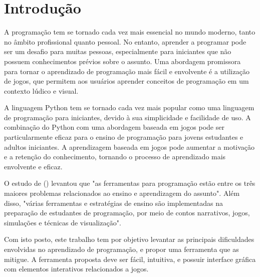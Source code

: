 \chapter[Introdução]{Introdução}

A programação tem se tornado cada vez mais essencial no mundo moderno, tanto no âmbito profissional quanto pessoal. No entanto, aprender a programar pode ser um desafio para muitas pessoas, especialmente para iniciantes que não possuem conhecimentos prévios sobre o assunto. Uma abordagem promissora para tornar o aprendizado de programação mais fácil e envolvente é a utilização de jogos, que permitem aos usuários aprender conceitos de programação em um contexto lúdico e visual.

A linguagem Python tem se tornado cada vez mais popular como uma linguagem de programação para iniciantes, devido à sua simplicidade e facilidade de uso. A combinação do Python com uma abordagem baseada em jogos pode ser particularmente eficaz para o ensino de programação para jovens estudantes e adultos iniciantes. A aprendizagem baseada em jogos pode aumentar a motivação e a retenção do conhecimento, tornando o processo de aprendizado mais envolvente e eficaz.

O estudo de \citeauthor{PereiraEtAll} (\citeyear{PereiraEtAll}) levantou que "as ferramentas para programação estão entre os três maiores problemas relacionados ao ensino e aprendizagem do assunto". Além disso, "várias ferramentas e estratégias de ensino são implementadas na preparação de estudantes de programação, por meio de contos narrativos, jogos, simulações e técnicas de visualização".

Com isto posto, este trabalho tem por objetivo levantar as principais dificuldades envolvidas no aprendizado de programação, e propor uma ferramenta que as mitigue. A ferramenta proposta deve ser fácil, intuitiva, e possuir interface gráfica com elementos interativos relacionados a jogos.